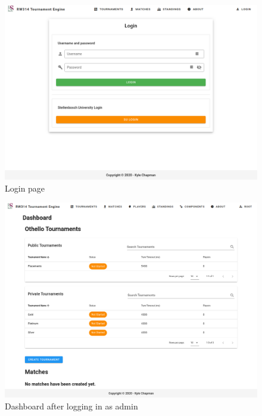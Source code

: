 \documentclass[a4paper, 12pt]{report}
\begin{document}
\begin{figure}[H]
	\centering
	\includegraphics[scale=0.41]{login.png}
	\caption{Login page}
	\label{fig:login}
\end{figure}
\begin{figure}[H]
	\centering
	\includegraphics[scale=0.37]{dashboard-admin.png}
	\caption{Dashboard after logging in as admin}
	\label{fig:dashboard-admin}
\end{figure}
\end{document}
